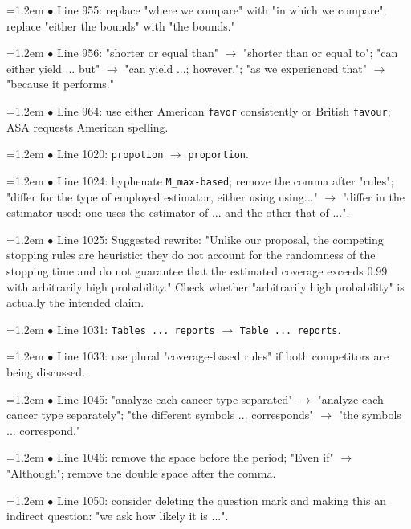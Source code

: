 \documentclass[10pt,a4paper]{article}
\begin{document}
\par\smallskip\noindent\hangindent=1.2em $\bullet$ Line 955: replace "where we compare" with "in which we compare"; replace "either the bounds" with "the bounds."
\par\smallskip\noindent\hangindent=1.2em $\bullet$ Line 956: "shorter or equal than" $\to$ "shorter than or equal to"; "can either yield ... but" $\to$ "can yield ...; however,"; "as we experienced that" $\to$ "because it performs."
\par\smallskip\noindent\hangindent=1.2em $\bullet$ Line 964: use either American \texttt{favor} consistently or British \texttt{favour}; ASA requests American spelling.
\par\smallskip\noindent\hangindent=1.2em $\bullet$ Line 1020: \texttt{propotion} $\to$ \texttt{proportion}.
\par\smallskip\noindent\hangindent=1.2em $\bullet$ Line 1024: hyphenate \texttt{M\_\allowbreak{}max-based}; remove the comma after "rules"; "differ for the type of employed estimator, either using using..." $\to$ "differ in the estimator used: one uses the estimator of ... and the other that of ...".
\par\smallskip\noindent\hangindent=1.2em $\bullet$ Line 1025: Suggested rewrite: "Unlike our proposal, the competing stopping rules are heuristic: they do not account for the randomness of the stopping time and do not guarantee that the estimated coverage exceeds 0.99 with arbitrarily high probability." Check whether "arbitrarily high probability" is actually the intended claim.
\par\smallskip\noindent\hangindent=1.2em $\bullet$ Line 1031: \texttt{Tables ... reports} $\to$ \texttt{Table ... reports}.
\par\smallskip\noindent\hangindent=1.2em $\bullet$ Line 1033: use plural "coverage-based rules" if both competitors are being discussed.
\par\smallskip\noindent\hangindent=1.2em $\bullet$ Line 1045: "analyze each cancer type separated" $\to$ "analyze each cancer type separately"; "the different symbols ... corresponds" $\to$ "the symbols ... correspond."
\par\smallskip\noindent\hangindent=1.2em $\bullet$ Line 1046: remove the space before the period; "Even if" $\to$ "Although"; remove the double space after the comma.
\par\smallskip\noindent\hangindent=1.2em $\bullet$ Line 1050: consider deleting the question mark and making this an indirect question: "we ask how likely it is ...".
\end{document}
